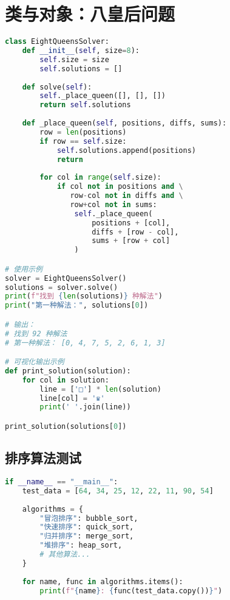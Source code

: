 \documentclass{article}
\begin{document}
\section{类与对象：八皇后问题}
\begin{lstlisting}[language=Python]
class EightQueensSolver:
    def __init__(self, size=8):
        self.size = size
        self.solutions = []
    
    def solve(self):
        self._place_queen([], [], [])
        return self.solutions
    
    def _place_queen(self, positions, diffs, sums):
        row = len(positions)
        if row == self.size:
            self.solutions.append(positions)
            return
        
        for col in range(self.size):
            if col not in positions and \
               row-col not in diffs and \
               row+col not in sums:
                self._place_queen(
                    positions + [col],
                    diffs + [row - col],
                    sums + [row + col]
                )

# 使用示例
solver = EightQueensSolver()
solutions = solver.solve()
print(f"找到 {len(solutions)} 种解法")
print("第一种解法：", solutions[0])

# 输出：
# 找到 92 种解法
# 第一种解法： [0, 4, 7, 5, 2, 6, 1, 3]

# 可视化输出示例
def print_solution(solution):
    for col in solution:
        line = ['□'] * len(solution)
        line[col] = '♛'
        print(' '.join(line))

print_solution(solutions[0])
\end{lstlisting}

\subsection{排序算法测试}
\begin{lstlisting}[language=Python]
if __name__ == "__main__":
    test_data = [64, 34, 25, 12, 22, 11, 90, 54]
    
    algorithms = {
        "冒泡排序": bubble_sort,
        "快速排序": quick_sort,
        "归并排序": merge_sort,
        "堆排序": heap_sort,
        # 其他算法...
    }
    
    for name, func in algorithms.items():
        print(f"{name}: {func(test_data.copy())}")
\end{lstlisting}
\end{document}

